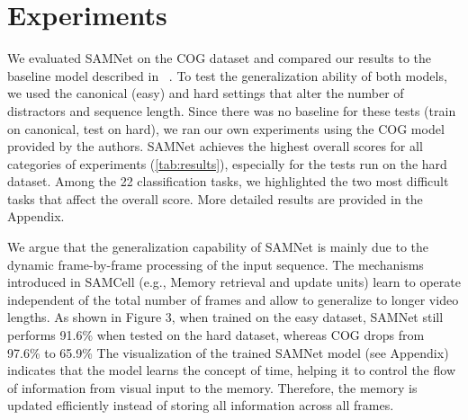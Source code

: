 \section{Experiments}

We evaluated SAMNet on the COG dataset and compared our results to the baseline model described in ~\cite{yang2018dataset}. To test the generalization ability of both models, we used the canonical (easy) and hard settings that alter the number of distractors and sequence length.  Since there was no baseline for these tests (train on canonical, test on hard), we ran our own experiments using the COG model provided by the authors.  SAMNet achieves the highest overall scores for all categories of experiments (\cref{tab:results}), especially for the tests run on the hard dataset.  Among the 22 classification tasks, we highlighted the two most difficult tasks that affect the overall score.  More detailed results are provided in the Appendix.

We argue that the generalization capability of SAMNet is mainly due to the dynamic frame-by-frame processing of the input sequence.  The mechanisms introduced in SAMCell (e.g., Memory retrieval and update units) learn to operate independent of the total number of frames and allow to generalize to longer video lengths. As shown in Figure 3, when trained on the easy dataset, SAMNet still performs 91.6\% when tested on the hard dataset, whereas COG drops from 97.6\% to 65.9\%   The visualization of the trained SAMNet model (see Appendix) indicates that the model learns the concept of time, helping it to control the flow of information from visual input to the memory.  Therefore, the memory is updated efficiently instead of storing all information across all frames.


%


